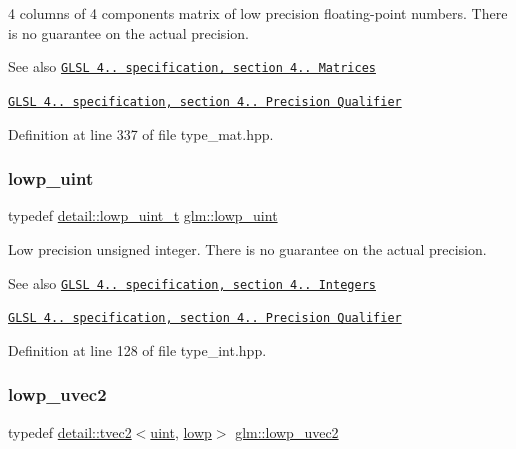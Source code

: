 4 columns of 4 components matrix of low precision floating-\/point numbers. There is no guarantee on the actual precision.

\begin{DoxySeeAlso}{See also}
\href{http://www.opengl.org/registry/doc/GLSLangSpec.4.20.8.pdf}{\tt G\+L\+SL 4.. specification, section 4.. Matrices} 

\href{http://www.opengl.org/registry/doc/GLSLangSpec.4.20.8.pdf}{\tt G\+L\+SL 4.. specification, section 4.. Precision Qualifier} 
\end{DoxySeeAlso}


Definition at line 337 of file type\+\_\+mat.\+hpp.

\mbox{\label{group__core__precision_ga8077c90f2c87e419ea6c273157dcc1fc}} 
\subsubsection{\texorpdfstring{lowp\+\_\+uint}{lowp\_uint}}
{\footnotesize\ttfamily typedef \hyperlink{namespaceglm_1_1detail_ad59c4581ad8ce0c3ef6146edaa7e15dc}{detail\+::lowp\+\_\+uint\+\_\+t} \hyperlink{group__core__precision_ga8077c90f2c87e419ea6c273157dcc1fc}{glm\+::lowp\+\_\+uint}}

Low precision unsigned integer. There is no guarantee on the actual precision.

\begin{DoxySeeAlso}{See also}
\href{http://www.opengl.org/registry/doc/GLSLangSpec.4.20.8.pdf}{\tt G\+L\+SL 4.. specification, section 4.. Integers} 

\href{http://www.opengl.org/registry/doc/GLSLangSpec.4.20.8.pdf}{\tt G\+L\+SL 4.. specification, section 4.. Precision Qualifier} 
\end{DoxySeeAlso}


Definition at line 128 of file type\+\_\+int.\+hpp.

\mbox{\label{group__core__precision_ga06c64bb528bbecf276ab2d4a2b6c934e}} 
\subsubsection{\texorpdfstring{lowp\+\_\+uvec2}{lowp\_uvec2}}
{\footnotesize\ttfamily typedef \hyperlink{structglm_1_1detail_1_1tvec2}{detail\+::tvec2}$<$\hyperlink{group__core__precision_ga4fd29415871152bfb5abd588334147c8}{uint}, \hyperlink{namespaceglm_a0f04f086094c747d227af4425893f545ae161af3fc695e696ce3bf69f7332bc2d}{lowp}$>$ \hyperlink{group__core__precision_ga06c64bb528bbecf276ab2d4a2b6c934e}{glm\+::lowp\+\_\+uvec2}}

